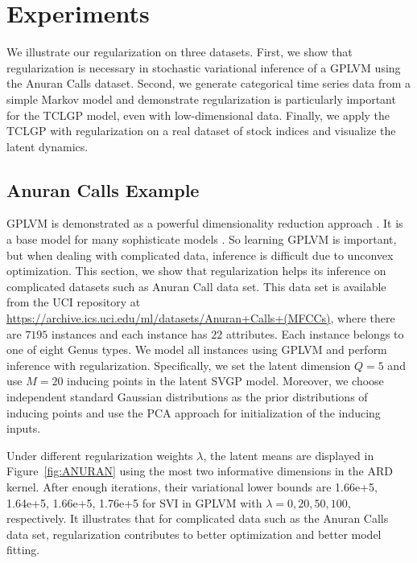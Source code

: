 \documentclass{article}
\begin{document}
\section{Experiments} \label{sec:E}
We illustrate our regularization on three datasets. First, we show that regularization is necessary in stochastic variational inference of a GPLVM using the Anuran Calls dataset. Second, we generate categorical time series data from a simple Markov model and demonstrate regularization is particularly important for the TCLGP model, even with low-dimensional data. Finally, we apply the TCLGP with regularization on a real dataset of stock indices and visualize the latent dynamics.

\subsection{Anuran Calls Example}
GPLVM is demonstrated as a powerful dimensionality reduction approach \citep{Lawrence_2003, Lawrence_2007}. It is a base model for many sophisticate models \citep{Lawrence_2007_HGP, Urtasun_2007, Damianou_2016}. So learning GPLVM is important, but when dealing with complicated data, inference is difficult due to unconvex optimization. This section, we show that regularization helps its inference on complicated datasets such as Anuran Call data set. This data set is available from the UCI repository at \url{https://archive.ics.uci.edu/ml/datasets/Anuran+Calls+(MFCCs)}, where there are $7195$ instances and each instance has $22$ attributes. Each instance belongs to one of eight Genus types. We model all instances using GPLVM and perform inference with regularization. Specifically, we set the latent dimension $Q = 5$ and use $M = 20$ inducing points in the latent SVGP model. Moreover, we choose independent standard Gaussian distributions as the prior distributions of inducing points and use the PCA approach for initialization of the inducing inputs.

Under different regularization weights $\lambda$, the latent means are displayed in Figure~\ref{fig:ANURAN} using the most two informative dimensions in the ARD kernel. After enough iterations, their variational lower bounds are 1.66e+5, 1.64e+5, 1.66e+5, 1.76e+5 for SVI in GPLVM with $\lambda = 0 ,20, 50, 100$, respectively. It illustrates that for complicated data such as the Anuran Calls data set, regularization contributes to better optimization and better model fitting.
\end{document}
